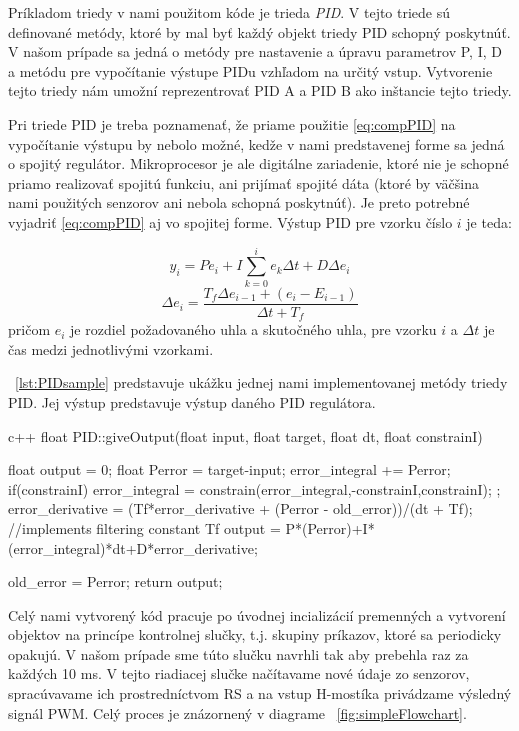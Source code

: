 Príkladom triedy v nami použitom kóde je trieda \textit{PID}. V tejto triede sú definované metódy, ktoré by mal byť každý objekt triedy PID schopný poskytnúť. V našom prípade sa jedná o metódy pre nastavenie a úpravu parametrov P, I, D a metódu pre vypočítanie výstupe PIDu vzhľadom na určitý vstup. Vytvorenie tejto triedy nám umožní reprezentrovať PID A a PID B ako inštancie tejto triedy. 

Pri triede PID je treba poznamenať, že priame použitie \ref{eq:compPID} na vypočítanie výstupu by nebolo možné, kedže v nami predstavenej forme sa jedná o spojitý regulátor. Mikroprocesor je ale digitálne zariadenie, ktoré nie je schopné priamo realizovať spojitú funkciu, ani prijímať spojité dáta (ktoré by väčšina nami použitých senzorov ani nebola schopná poskytnúť). Je preto potrebné vyjadriť \ref{eq:compPID} aj vo spojitej forme. Výstup PID pre vzorku číslo $i$ je teda:

\begin{equation}
y_i = Pe_i + I\sum_{k=0}^{i}{e_k}\Delta t + D\Delta e_i 
\end{equation}
\begin{equation}
\Delta e_i = \dfrac{T_f\Delta e_{i-1} + (e_i - E_{i-1})}{\Delta t + T_f}
\end{equation}
pričom $e_i$ je rozdiel požadovaného uhla a skutočného uhla, pre vzorku $i$ a $\Delta t$ je čas medzi jednotlivými vzorkami.

\listingname~\ref{lst:PIDsample} predstavuje ukážku jednej nami implementovanej metódy triedy PID. Jej výstup predstavuje výstup daného PID regulátora.  


\begin{inlinecode}[label={lst:PIDsample},caption={Príklad jednej z metód triedy PID}]{c++}
float PID::giveOutput(float input, float target, float dt, float constrainI){
    float output  = 0;
    float Perror = target-input;
    error_integral += Perror;
    if(constrainI){
        error_integral = constrain(error_integral,-constrainI,constrainI);
    };
    error_derivative = (Tf*error_derivative + (Perror - old_error))/(dt + Tf);       //implements filtering constant Tf
    output = P*(Perror)+I*(error_integral)*dt+D*error_derivative;

    old_error = Perror;
    return output;
}
\end{inlinecode}

Celý nami vytvorený kód pracuje po úvodnej incializácií premenných a vytvorení objektov na princípe kontrolnej slučky, t.j. skupiny príkazov, ktoré sa periodicky opakujú. V našom prípade sme túto slučku navrhli tak aby prebehla raz za každých 10 ms. V tejto riadiacej slučke načítavame nové údaje zo senzorov, spracúvavame ich prostredníctvom \ac{RS} a na vstup H-mostíka privádzame výsledný signál \ac{PWM}. Celý proces je znázornený v diagrame \figurename~\ref{fig:simpleFlowchart}.


